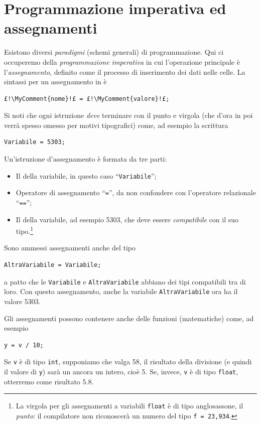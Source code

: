 	\section{Programmazione imperativa ed assegnamenti}
Esistono diversi \emph{paradigmi} (schemi generali) di programmazione.
Qui ci occuperemo della \emph{programmazione imperativa} in cui l'operazione principale è l'\emph{assegnamento}, definito come il processo di inserimento dei dati nelle celle.
La sintassi per un assegnamento in  è 
\begin{lstlisting}
£!\MyComment{nome}!£ = £!\MyComment{valore}!£;
\end{lstlisting}
Si noti che ogni istruzione \emph{deve} terminare con il punto e virgola (che d'ora in poi verrà spesso omesso per motivi tipografici) come, ad esempio la scrittura
\begin{lstlisting}
Variabile = 5303;
\end{lstlisting}
Un'istruzione d'assegnamento è formata da tre parti:
\begin{itemize}
	\item
Il  della variabile, in questo caso ``\lstinline!Variabile!'';
	\item
Operatore di assegnamento ``\lstinline!=!'', da non confondere con l'operatore relazionale ``\lstinline!==!'';
	\item
Il  della variabile, ad esempio \num{5303}, che deve essere \emph{compatibile} con il suo tipo.\footnote{%
La virgola per gli assegnamenti a variabili \lstinline!float! è di tipo anglosassone, il \emph{punto}: il compilatore non riconoscerà un numero del tipo \lstinline!f = 23,934!.
}
\end{itemize}
Sono ammessi assegnamenti anche del tipo
\begin{lstlisting}
AltraVariabile = Variabile;
\end{lstlisting}
a patto che le \lstinline!Variabile! e \lstinline!AltraVariabile! abbiano dei tipi compatibili tra di loro.
Con questo assegnamento, anche la variabile \lstinline!AltraVariabile! ora ha il valore \num{5303}.


Gli assegnamenti possono contenere anche delle funzioni (matematiche) come, ad esempio
\begin{lstlisting}
y = v / 10;
\end{lstlisting}
Se \lstinline!v! è di tipo \lstinline!int!, supponiamo che valga \num{58}, il risultato della divisione (e quindi il valore di \lstinline!y!) sarà un ancora un intero, cioè \num{5}.
Se, invece, \lstinline!v! è di tipo \lstinline!float!, otterremo come risultato \num{5.8}.


